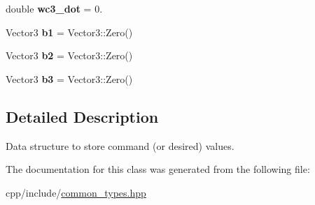 \begin{DoxyCompactItemize}
\item 
double {\bfseries wc3\+\_\+dot} = 0.\hypertarget{classfdcl_1_1command__t_a59b308f32e194eeae8d6a0dc9a9ccb80}{}\label{classfdcl_1_1command__t_a59b308f32e194eeae8d6a0dc9a9ccb80}

\item 
Vector3 {\bfseries b1} = Vector3\+::\+Zero()\hypertarget{classfdcl_1_1command__t_ad7df0cf47e259dd108444e987a882135}{}\label{classfdcl_1_1command__t_ad7df0cf47e259dd108444e987a882135}

\item 
Vector3 {\bfseries b2} = Vector3\+::\+Zero()\hypertarget{classfdcl_1_1command__t_a36f9672461220c509e01f8346ed422c2}{}\label{classfdcl_1_1command__t_a36f9672461220c509e01f8346ed422c2}

\item 
Vector3 {\bfseries b3} = Vector3\+::\+Zero()\hypertarget{classfdcl_1_1command__t_a9c4eccec9e1b04d87dab61e0f56d78c2}{}\label{classfdcl_1_1command__t_a9c4eccec9e1b04d87dab61e0f56d78c2}

\end{DoxyCompactItemize}


\subsection{Detailed Description}
Data structure to store command (or desired) values. 

The documentation for this class was generated from the following file\+:\begin{DoxyCompactItemize}
\item 
cpp/include/\hyperlink{common__types_8hpp}{common\+\_\+types.\+hpp}\end{DoxyCompactItemize}
